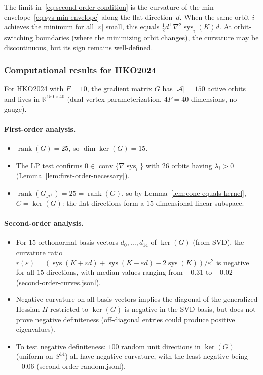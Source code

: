 \begin{remark}\label{rem:non-smooth-curvature}
  The limit in~\eqref{eq:second-order-condition} is the curvature of the
  min-envelope~\eqref{eq:sys-min-envelope} along the flat direction~$d$.
  When the same orbit $i$ achieves the minimum for all $|\varepsilon|$ small,
  this equals $\frac{1}{2} d^\top \nabla^2 \operatorname{sys}_i(K) d$.
  At orbit-switching boundaries (where the minimizing orbit changes),
  the curvature may be discontinuous, but its sign remains well-defined.
\end{remark}

\subsubsection{Computational results for HKO2024}

For HKO2024 with $F = 10$, the gradient matrix $G$ has $|\mathcal{A}| = 150$
active orbits and lives in $\mathbb{R}^{150 \times 40}$
(dual-vertex parameterization, $4F = 40$ dimensions, no gauge).

\paragraph{First-order analysis.}
\begin{itemize}
  \item $\operatorname{rank}(G) = 25$, so $\dim\ker(G) = 15$.
  \item The LP test confirms $0 \in \operatorname{conv}\{\nabla\operatorname{sys}_i\}$
    with $26$ orbits having $\lambda_i > 0$ (Lemma~\ref{lem:first-order-necessary}).
  \item $\operatorname{rank}(G_{\mathcal{A}^+}) = 25 = \operatorname{rank}(G)$,
    so by Lemma~\ref{lem:cone-equals-kernel}, $C = \ker(G)$:
    the flat directions form a $15$-dimensional linear subspace.
\end{itemize}

\paragraph{Second-order analysis.}
\begin{itemize}
  \item For $15$ orthonormal basis vectors $d_0, \ldots, d_{14}$ of $\ker(G)$
    (from SVD), the curvature ratio
    $r(\varepsilon) = (\operatorname{sys}(K + \varepsilon d) + \operatorname{sys}(K - \varepsilon d) - 2\operatorname{sys}(K)) / \varepsilon^2$
    is negative for all $15$ directions, with median values ranging from
    $-0.31$ to $-0.02$ (second-order-curves.jsonl).
  \item Negative curvature on all basis vectors implies the diagonal of the
    generalized Hessian $H$ restricted to $\ker(G)$ is negative in the SVD
    basis, but does not prove negative definiteness (off-diagonal entries
    could produce positive eigenvalues).
  \item To test negative definiteness: $100$ random unit directions
    in $\ker(G)$ (uniform on $S^{14}$) all have negative curvature,
    with the least negative being $-0.06$ (second-order-random.jsonl).
\end{itemize}

